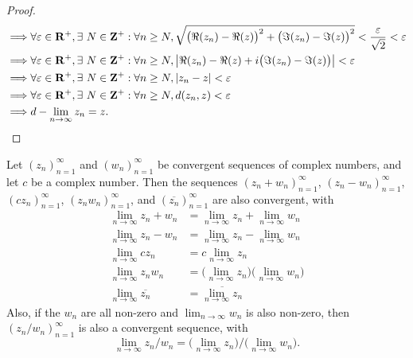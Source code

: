 \begin{proof}
\begin{align*}
        \implies & \forall \varepsilon \in \mathbf{R}^+, \exists\ N \in \mathbf{Z}^+ : \forall n \geq N, \sqrt{\big(\Re(z_n) - \Re(z)\big)^2 + \big(\Im(z_n) - \Im(z)\big)^2} < \frac{\varepsilon}{\sqrt{2}} < \varepsilon \\
        \implies & \forall \varepsilon \in \mathbf{R}^+, \exists\ N \in \mathbf{Z}^+ : \forall n \geq N, \abs*{\Re(z_n) - \Re(z) + i \big(\Im(z_n) - \Im(z)\big)} < \varepsilon                                            \\
        \implies & \forall \varepsilon \in \mathbf{R}^+, \exists\ N \in \mathbf{Z}^+ : \forall n \geq N, \abs*{z_n - z} < \varepsilon                                                                                      \\
        \implies & \forall \varepsilon \in \mathbf{R}^+, \exists\ N \in \mathbf{Z}^+ : \forall n \geq N, d(z_n, z) < \varepsilon                                                                                           \\
        \implies & d - \lim_{n \to \infty} z_n = z.
    \end{align*}
\end{proof}

\begin{lemma}\label{4.6.14}
    Let \((z_n)_{n = 1}^\infty\) and \((w_n)_{n = 1}^\infty\) be convergent sequences of complex numbers, and let \(c\) be a complex number.
    Then the sequences \((z_n + w_n)_{n = 1}^\infty\), \((z_n - w_n)_{n = 1}^\infty\), \((c z_n)_{n = 1}^\infty\), \((z_n w_n)_{n = 1}^\infty\), and \((\overline{z_n})_{n = 1}^\infty\) are also convergent, with
    \begin{align*}
        \lim_{n \to \infty} z_n + w_n      & = \lim_{n \to \infty} z_n + \lim_{n \to \infty} w_n                       \\
        \lim_{n \to \infty} z_n - w_n      & = \lim_{n \to \infty} z_n - \lim_{n \to \infty} w_n                       \\
        \lim_{n \to \infty} c z_n          & = c \lim_{n \to \infty} z_n                                               \\
        \lim_{n \to \infty} z_n w_n        & = \bigg(\lim_{n \to \infty} z_n\bigg) \bigg(\lim_{n \to \infty} w_n\bigg) \\
        \lim_{n \to \infty} \overline{z_n} & = \overline{\lim_{n \to \infty} z_n}
    \end{align*}
    Also, if the \(w_n\) are all non-zero and \(\lim_{n \to \infty} w_n\) is also non-zero, then \((z_n / w_n)_{n = 1}^\infty\) is also a convergent sequence, with
    \[
        \lim_{n \to \infty} z_n / w_n = \bigg(\lim_{n \to \infty} z_n\bigg) / \bigg(\lim_{n \to \infty} w_n\bigg).
    \]
\end{lemma}

